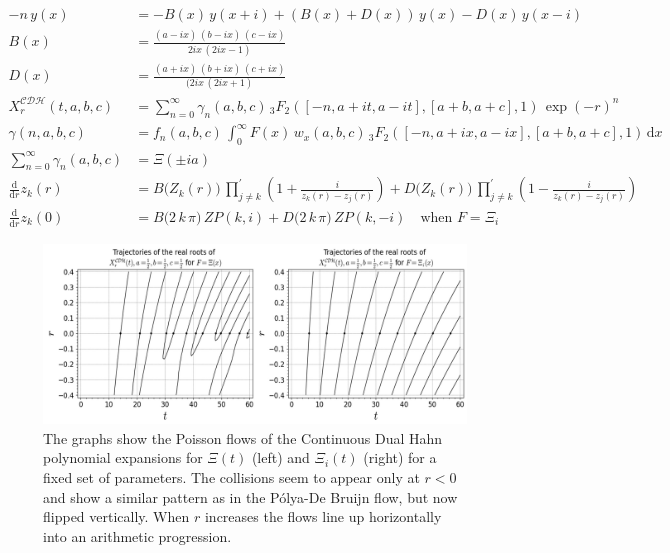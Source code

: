 \documentclass[a4paper,11pt,twoside]{amsart}
\begin{document}
\begin{small}
{\begin{minipage}{\textwidth}
\begin{align}
  -n\,y(x) &= -B(x)\,y(x+i)+\left(B(x)+D(x)\right)\,y(x)-D(x)\,y(x-i) \\
  B(x)&=\frac{(a-ix)\,(b-ix)\,(c-ix)}{2ix\,(2ix-1)} \\
  D(x)&=\frac{(a+ix)\,(b+ix)\,(c+ix)}{(2ix\,(2ix+1)} \\
  X^\mathcal{CDH}_r(t,a,b,c) &= \sum_{n=0}^\infty \gamma_n(a,b,c)\,{}_3F_2\left([-n, a+it, a-it],[a+b,a+c],1\right)\,\exp\left(-r\right)^n \\ 
  \gamma(n,a,b,c) &= f_n(a,b,c)\,\int_{0}^{\infty} F(x)\,w_x(a,b,c)\,{}_3F_2\left([-n, a+ix, a-ix],[a+b,a+c],1\right)\,\mathrm{d}x \\
  \sum_{n=0}^\infty \gamma_n(a,b,c) &= \Xi(\pm ia) \\
  \frac{\mathrm{d}}{\mathrm{d} r} z_k(r)&=B\big(Z_k(r)\big)\,\prod_{j \ne k}^{'} \left(1+\frac{i}{z_k(r)-z_j(r)}\right)+D\big(Z_k(r)\big)\,\prod_{j \ne k}^{'} \left(1-\frac{i}{z_k(r)-z_j(r)}\right) \\
  \frac{\mathrm{d}}{\mathrm{d} r} z_k(0)&= B\big(2\,k\,\pi\big)\,ZP(k,i)+D\big(2\,k\,\pi)\,ZP(k,-i)\quad \text{when } F=\Xi_i 
\end{align}
\end{minipage}}
\begin{figure}[H]
  \includegraphics[width=1\linewidth]{ContDualHahnFlowdouble.jpeg}
  \caption{The graphs show the Poisson flows of the Continuous Dual Hahn polynomial expansions for $\Xi(t)$ (left) and $\Xi_i(t)$ (right) for a fixed set of parameters. The collisions seem to appear only at $r < 0$ and show a similar pattern as in the Pólya-De Bruijn flow, but now flipped vertically. When $r$ increases the flows line up horizontally into an arithmetic progression.}
  \label{fig:flowLCDH}
\end{figure}
\pagebreak
\noindent{}
\end{small}
\end{document}
